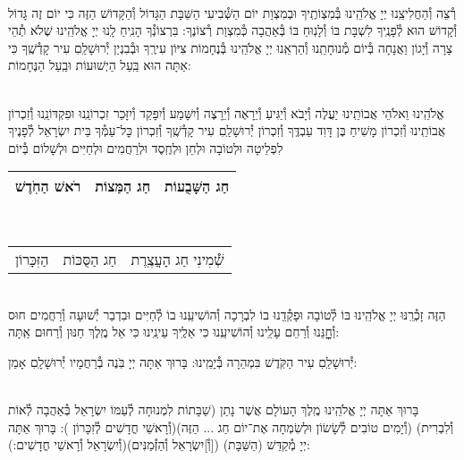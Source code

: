 \documentclass[twoside, openany, parskip=half, 11pt]{book}
\begin{document}
\vspace{-.25\baselineskip}
\begin{sometimes}

\shabbos\\
רְ֯צֵה וְ֯הַחֲלִיצֵֽנוּ יְיָ אֱלֹהֵֽינוּ בְּ֯מִצְוֹתֶֽיךָ וּבְמִצְוַת יוֹם הַשְּׁ֯בִיעִי הַשַּׁבָּת הַגָּדוֹל וְ֯הַקָּדוֹשׁ הַזֶּה כִּי יוֹם זֶה גָּדוֹל וְ֯קָדוֹשׁ הוּא לְ֯פָנֶֽיךָ לִשְׁבָּת בּוֹ וְ֯לָנֽוּחַ בּוֹ בְּ֯אַהֲבָה כְּ֯מִצְוַת רְ֯צוֹנֶךָ: בִּרְצוֹנְ֯ךָ הָנִֽיחַ לָֽנוּ יְיָ אֱלֹהֵֽינוּ שֶׁלֹא תְ֯הֵי צָרָה וְ֯יָגוֹן וַאֲנָחָה בְּ֯יוֹם מְ֯נוּחָתֵֽנוּ וְ֯הַרְאֵֽנוּ יְיָ אֱלֹהֵֽינוּ בְּ֯נֶחָמוֹת צִיּוֹן עִירֶֽךָ וּבְ֯בִנְיַן יְ֯רוּשָׁלַֽםִ עִיר קָדְ֯שֶֽׁךָ כִּי אַתָּה הוּא בַּֽעַל הַיְשׁוּעוֹת וּבַֽעַל הַנֶּחָמוֹת:


\sepline %

\vspace{-.25\baselineskip}
\\
אֱלֹהֵֽינוּ וֵאלֹהֵי אֲבוֹתֵֽינוּ יַעֲלֶה וְ֯יָבֹא וְ֯יַגִּיעַ וְ֯יֵרָאֶה וְ֯יֵרָצֶה וְ֯יִשָּׁמַע וְ֯יִפָּקֵד וְ֯יִזָּכֵר זִכְרוֹנֵֽנוּ וּפִקְדּוֹנֵֽנוּ וְ֯זִכְרוֹן אֲבוֹתֵֽינוּ וְ֯זִכְרוֹן מָשִׁיחַ בֶּן דָּוִד עַבְדֶּֽךָ וְ֯זִכְרוֹן יְ֯רוּשָׁלַֽםִ עִיר קָדְ֯שֶֽׁךָ וְ֯זִכְרוֹן כׇּל־עַמְּ֯ךָ בֵּית יִשְׂרָאֵל לְ֯פָנֶיךָ לִפְלֵיטָה וּלְטוֹבָה וּלְחֵן וּלְחֶֽסֶד וּלְרַחֲמִים וּלְחַיִּים וּלְשָׁלוֹם בְּ֯יוֹם\\
\begin{tabular}{c|c|c}
רֹאשׁ הַחֹֽדֶשׁ & חַג הַמַּצוֹת & חַג הַשָּׁבֻעוֹת\\ \hline
\end{tabular}\\
\begin{tabular}{c|c|c}
הַזִּכָּרוֹן & חַג הַסֻּכּוֹת & שְׁ֯מִינִי חַג הָעֲצֶֽרֶת
\end{tabular}\\
הַזֶּה זָכְ֯רֵֽנּוּ יְיָ אֱלֹהֵֽינוּ בּוֹ לְ֯טוֹבָה וּפָקְ֯דֵֽנוּ בוֹ לִבְרָכָה וְ֯הוֹשִׁיעֵֽנוּ בוֹ לְ֯חַיִּים וּבִדְבַר יְ֯שׁוּעָה וְ֯רַחֲמִים חוּס וְ֯חׇׇׇׇׇנֵּנוּ וְ֯רַחֵם עָלֵֽינוּ וְ֯הוֹשִׁיעֵֽנוּ כִּי אֵלֶֽיךָ עֵינֵֽינוּ כִּי אֵל מֶֽלֶךְ חַנּוּן וְ֯רַחוּם אַֽתָּה:

\end{sometimes}

יְ֯רוּשָׁלַֽםִ עִיר הַקֹּֽדֶשׁ בִּמְהֵרָה בְּ֯יָמֵֽינוּ: בָּרוּךְ אַתָּה יְיָ בֹּֽנֶה בְ֯רַחֲמָיו יְ֯רוּשָׁלָֽםִ אָמֵן:

\begin{sometimes}

\\
בָּרוּךְ אַתָּה יְיָ אֱלֹהֵֽינוּ מֶֽלֶךְ הָעוֹלָם אֲשֶׁר נָתַן (שַׁבָּתוֹת לִמְנוּחָה לְ֯עַמּוֹ יִשְׂרָאֵל בְּ֯אַהֲבָה לְ֯אוֹת וְ֯לִבְרִית)
(וְ֯יָמִים טוֹבִים לְ֯שָׂשׂוֹן וּלְשִׂמְחָה אֶת־יוֹם חַג ... הַזֶּה)(וְ֯רָאשֵׁי חֳדָשִׁים לְ֯זִכָּרוֹן ):
בָּרוּךְ אַתָּה יְיָ מְ֯קַדֵּשׁ (הַשַּׁבָּת) ([וְ֯]יִשְׂרָאֵל וְ֯הַזְּ֯מַנִּים)(וְ֯יִשְׂרָאֵל וְ֯רָאשֵׁי חֳדָשִׁים:):

\end{sometimes}
\end{document}

